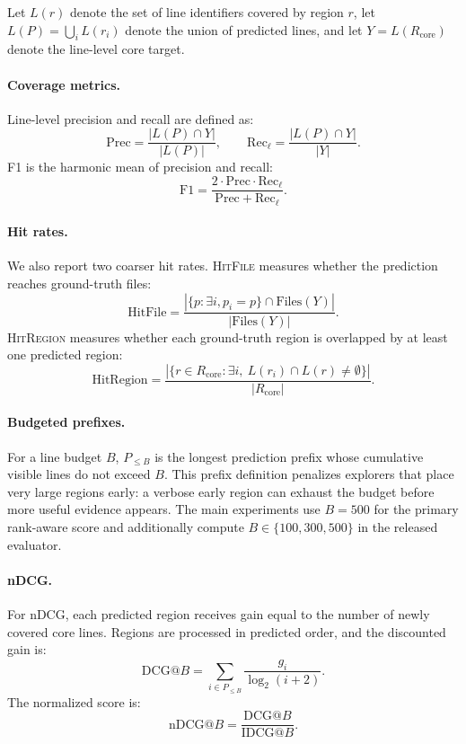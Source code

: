 Let $L(r)$ denote the set of line identifiers covered by region $r$, let
$L(P)=\bigcup_i L(r_i)$ denote the union of predicted lines, and let
$Y=L(R_{\mathrm{core}})$ denote the line-level core target.

\paragraph{Coverage metrics.}
Line-level precision and recall are defined as:
\[
\mathrm{Prec}
=
\frac{|L(P)\cap Y|}{|L(P)|},
\qquad
\mathrm{Rec}_{\ell}
=
\frac{|L(P)\cap Y|}{|Y|}.
\]
F1 is the harmonic mean of precision and recall:
\[
\mathrm{F1}
=
\frac{2\cdot \mathrm{Prec}\cdot \mathrm{Rec}_{\ell}}
{\mathrm{Prec}+\mathrm{Rec}_{\ell}}.
\]

\paragraph{Hit rates.}
We also report two coarser hit rates. \textsc{HitFile} measures whether the
prediction reaches ground-truth files:
\[
\mathrm{HitFile}
=
\frac{
|\{p:\exists i, p_i=p\}\cap \mathrm{Files}(Y)|
}{
|\mathrm{Files}(Y)|
}.
\]
\textsc{HitRegion} measures whether each ground-truth region is overlapped by
at least one predicted region:
\[
\mathrm{HitRegion}
=
\frac{
|\{r\in R_{\mathrm{core}}:\exists i,\ L(r_i)\cap L(r)\neq \emptyset\}|
}{
|R_{\mathrm{core}}|
}.
\]

\paragraph{Budgeted prefixes.}
For a line budget $B$, $P_{\le B}$ is the longest prediction prefix whose
cumulative visible lines do not exceed $B$. This prefix definition penalizes
explorers that place very large regions early: a verbose early region can
exhaust the budget before more useful evidence appears. The main experiments use
$B=500$ for the primary rank-aware score and additionally compute
$B\in\{100,300,500\}$ in the released evaluator.

\paragraph{nDCG.}
For nDCG, each predicted region receives gain equal to the number of newly
covered core lines. Regions are processed in predicted order, and the discounted
gain is:
\[
\mathrm{DCG}@B
=
\sum_{i\in P_{\le B}}
\frac{g_i}{\log_2(i+2)}.
\]
The normalized score is:
\[
\mathrm{nDCG}@B
=
\frac{\mathrm{DCG}@B}{\mathrm{IDCG}@B}.
\]

